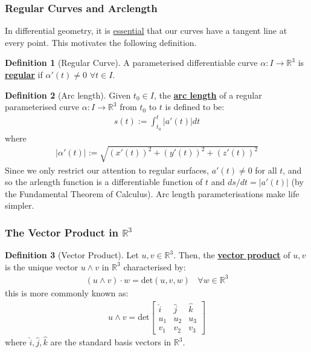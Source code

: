 \documentclass[11pt]{scrartcl}
\newcommand{\R}[0]{\mathbb{R}}
\theoremstyle{definition}
\newtheorem{definition}{Definition}
\theoremstyle{remark}
\newcommand{\dfn}[1]{\textbf{\underline{#1}}}
\newcommand{\idx}[2]{\int_{#1}^{#2}}
\begin{document}
{\subsubsection{Regular Curves and Arclength}
In differential geometry, it is \underline{essential} that our curves have a tangent line at every point. This motivates the following definition. 

\begin{definition}[Regular Curve]
	A parameterised differentiable curve $\alpha: I \rightarrow \R^3$ is \dfn{regular} if $\alpha' (t) \neq 0$ $\forall t \in I$. 
\end{definition}

\begin{definition}[Arc length]
	Given $t_0 \in I$, the \dfn{arc length} of a regular parameterised curve $\alpha: I \rightarrow \R^3$ from $t_0$ to $t$ is defined to be: 
	\begin{align*}
		s(t) := \idx{t_0}{t} | a'(t) | dt 
	\end{align*}
	where
	\begin{align*}
		| \alpha' (t) | := \sqrt{(x'(t))^2 + (y'(t))^2 + (z'(t))^2}
	\end{align*}
	Since we only restrict our attention to regular surfaces, $a'(t) \neq 0$ for all $t$, and so the arlength function is a differentiable function of $t$ and $ds/dt = |a'(t)|$ (by the Fundamental Theorem of Calculus). Arc length parameterisations make life simpler. 
\end{definition}

\subsubsection{The Vector Product in $\R^3$}

\begin{definition}[Vector Product]
	Let $u,v \in \R^3$. Then, the \dfn{vector product} of $u,v$ is the unique vector $u \wedge v$ in $\R^3$ characterised by: 
	\begin{align*}
		(u \wedge v) \cdot w = \text{det}(u,v,w)\ \text{  } \forall w \in \R^3
	\end{align*}
	this is more commonly known as:
	\begin{align*}
		u \wedge v = \text{det} \begin{bmatrix}
			\hat{i} & \hat{j} & \hat{k} \\
			u_1 & u_2 & u_3 \\
			v_1 & v_2 & v_3 
		\end{bmatrix}
	\end{align*}
	where $\hat{i}, \hat{j}, \hat{k}$ are the standard basis vectors in $\R^3$. 
\end{definition}

}
\end{document}
